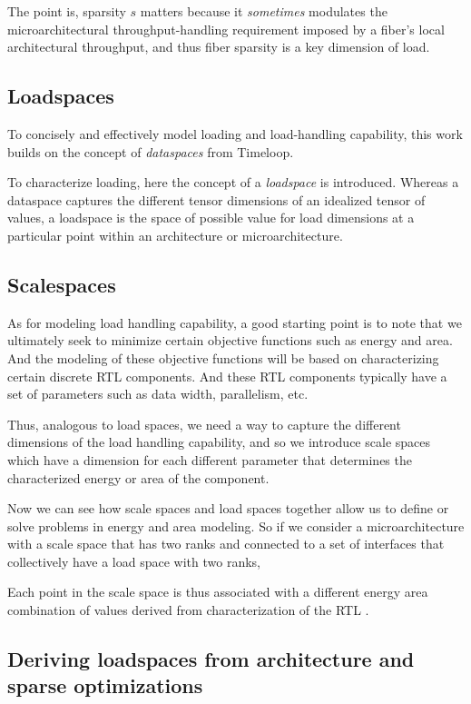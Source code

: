 \begin{itemize}
    The point is, sparsity $s$ matters because it \textit{sometimes} modulates the microarchitectural throughput-handling requirement imposed by a fiber's local architectural throughput, and thus fiber sparsity is a key dimension of load.

\subsection{Loadspaces}

To concisely and effectively model loading and load-handling capability, this work builds on the concept of \textit{dataspaces} from Timeloop\cite{timeloop}.

To characterize loading, here the concept of a \textit{loadspace} is introduced. Whereas a dataspace captures the different tensor dimensions of an idealized tensor of values, a loadspace is the space of possible value for load dimensions at a particular point within an architecture or microarchitecture.

\subsection{Scalespaces}

As for modeling load handling capability, a good starting point is to note that we ultimately seek to minimize certain objective functions such as energy and area. And the modeling of these objective functions will be based on characterizing certain discrete RTL components. And these RTL components typically have a set of parameters such as data width, parallelism, etc.

Thus, analogous to load spaces, we need a way to capture the different dimensions of the load handling capability, and so we introduce scale spaces which have a dimension for each different parameter that determines the characterized energy or area of the component.

Now we can see how scale spaces and load spaces together allow us to define or solve problems in energy and area modeling. So if we consider a microarchitecture with a scale space that has two ranks and connected to a set of interfaces that collectively have a load space with two ranks,

Each point in the scale space is thus associated with a different energy area combination of values derived from characterization of the RTL .

\subsection{Deriving loadspaces from architecture and sparse optimizations}


\end{itemize}
